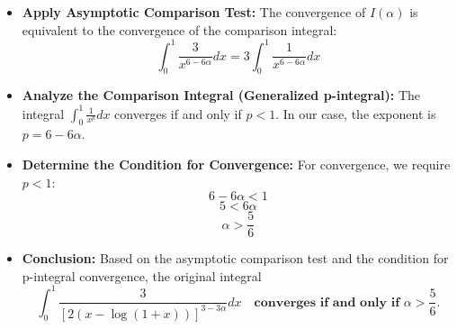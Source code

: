 \begin{cascade}
\begin{itemize}
		\item \textbf{Apply Asymptotic Comparison Test:}
		      The convergence of $I(\alpha)$ is equivalent to the convergence of the comparison integral:
		      $$ \int_0^1 \frac{3}{x^{6-6\alpha}} dx = 3 \int_0^1 \frac{1}{x^{6-6\alpha}} dx $$

		\item \textbf{Analyze the Comparison Integral (Generalized p-integral):}
		      The integral $\int_0^1 \frac{1}{x^p} dx$ converges if and only if $p < 1$.
		      In our case, the exponent is $p = 6 - 6\alpha$.

		\item \textbf{Determine the Condition for Convergence:}
		      For convergence, we require $p < 1$:
		      $$ 6 - 6\alpha < 1 $$
		      $$ 5 < 6\alpha $$
		      $$ \alpha > \frac{5}{6} $$

		\item \textbf{Conclusion:}
		      Based on the asymptotic comparison test and the condition for p-integral convergence, the original integral
		      $$ \int_0^1 \frac{3}{[2(x - \log(1+x))]^{3-3\alpha}} dx \quad \textbf{converges if and only if } \alpha > \frac{5}{6}. $$
	\end{itemize}
\end{cascade}

\clearpage

